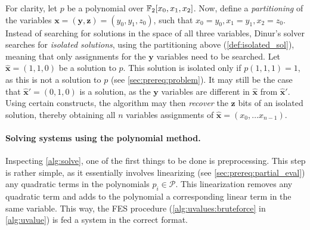 For clarity, let $p$ be a polynomial over $\mathbb{F}_2[x_0,x_1,x_2]$. Now, define a \textit{partitioning} of the variables $\mathbf{x} = (\mathbf{y}, \mathbf{z}) = (y_0, y_1, z_0)$, such that $x_0 = y_0, x_1 = y_1, x_2 = z_0$. Instead of searching for solutions in the space of all three variables, Dinur's solver searches for \textit{isolated solutions}, using the partitioning above (\cref{def:isolated_sol}), meaning that only assignments for the $\mathbf{y}$ variables need to be searched. Let $\hat{\mathbf{x}} = (1,1,0)$ be a solution to $p$. This solution is isolated only if $p(1,1,1) = 1$, as this is not a solution to $p$ (see \cref{sec:prereq:problem}). It may still be the case that $\hat{\mathbf{x}}' = (0,1,0)$ is a solution, as the $\mathbf{y}$ variables are different in $\hat{\mathbf{x}}$ from $\hat{\mathbf{x}}'$. Using certain constructs, the algorithm may then \textit{recover} the $\mathbf{z}$ bits of an isolated solution, thereby obtaining all $n$ variables assignments of $\hat{\mathbf{x}} = (x_0, \dots x_{n - 1})$. 

\paragraph{Solving systems using the polynomial method.} Inspecting \cref{alg:solve}, one of the first things to be done is preprocessing. This step is rather simple, as it essentially involves linearizing (see \cref{sec:prereq:partial_eval}) any quadratic terms in the polynomials $p_i \in \mathcal{P}$. This linearization removes any quadratic term and adds to the polynomial a corresponding linear term in the same variable. This way, the FES procedure (\cref{alg:uvalues:bruteforce} in \cref{alg:uvalue}) is fed a system in the correct format.

